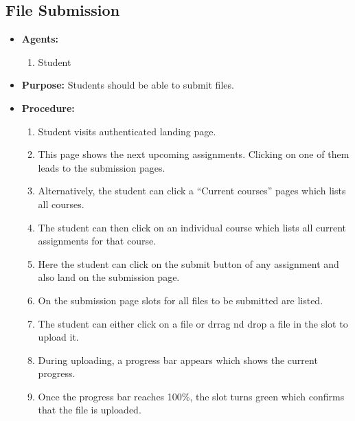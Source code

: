 \subsection{File Submission}

\begin{itemize}
  \item \textbf{Agents:}
  \begin{enumerate}
    \item Student
  \end{enumerate}
  \item \textbf{Purpose:} Students should be able to submit files.
  \item \textbf{Procedure:}
  \begin{enumerate}
    \item Student visits authenticated landing page.
    \item This page shows the next upcoming assignments. Clicking on one of them leads to the submission pages.
    \item Alternatively, the student can click a ``Current courses'' pages which lists all courses.
    \item The student can then click on an individual course which lists all current assignments for that course.
    \item Here the student can click on the submit button of any assignment and also land on the submission page.
    \item On the submission page slots for all files to be submitted are listed.
    \item The student can either click on a file or drrag nd drop a file in the slot to upload it.
    \item During uploading, a progress bar appears which shows the current progress.
    \item Once the progress bar reaches 100\%, the slot turns green which confirms that the file is uploaded. 
  \end{enumerate}
\end{itemize}
